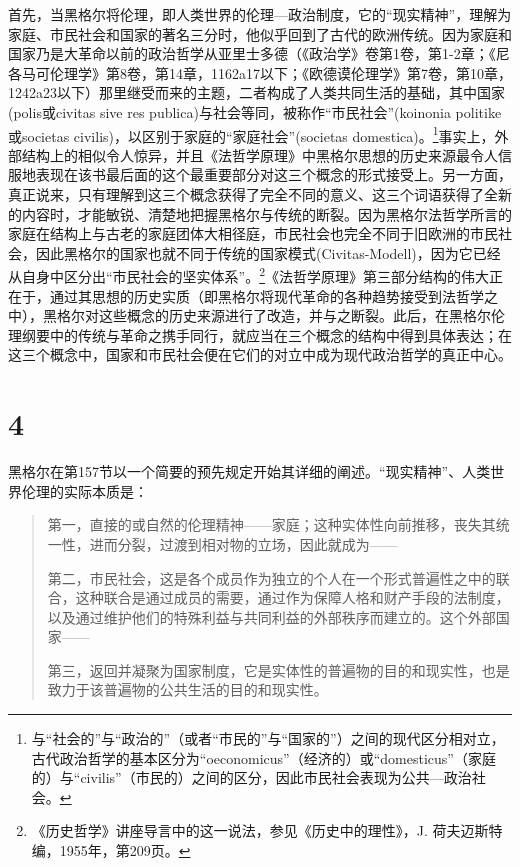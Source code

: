 首先，当黑格尔将伦理，即人类世界的伦理—政治制度，它的“现实精神”，理解为家庭、市民社会和国家的著名三分时，他似乎回到了古代的欧洲传统。因为家庭和国家乃是大革命以前的政治哲学从亚里士多德（《政治学》卷第1卷，第1-2章；《尼各马可伦理学》第8卷，第14章，1162a17以下；《欧德谟伦理学》第7卷，第10章，1242a23以下）那里继受而来的主题，二者构成了人类共同生活的基础，其中国家(polis或civitas sive res publica)与社会等同，被称作“市民社会”(koinonia politike或societas civilis)，以区别于家庭的“家庭社会”(societas domestica)。\footnote{与“社会的”与“政治的”（或者“市民的”与“国家的”）之间的现代区分相对立，古代政治哲学的基本区分为“oeconomicus”（经济的）或“domesticus”（家庭的）与“civilis”（市民的）之间的区分，因此市民社会表现为公共—政治社会。}事实上，外部结构上的相似令人惊异，并且《法哲学原理》中黑格尔思想的历史来源最令人信服地表现在该书最后面的这个最重要部分对这三个概念的形式接受上。另一方面，真正说来，只有理解到这三个概念获得了完全不同的意义、这三个词语获得了全新的内容时，才能敏锐、清楚地把握黑格尔与传统的断裂。因为黑格尔法哲学所言的家庭在结构上与古老的家庭团体大相径庭，市民社会也完全不同于旧欧洲的市民社会，因此黑格尔的国家也就不同于传统的国家模式(Civitas-Modell)，因为它已经从自身中区分出“市民社会的坚实体系”。\footnote{《历史哲学》讲座导言中的这一说法，参见《历史中的理性》，J. 荷夫迈斯特编，1955年，第209页。}《法哲学原理》第三部分结构的伟大正在于，通过其思想的历史实质（即黑格尔将现代革命的各种趋势接受到法哲学之中），黑格尔对这些概念的历史来源进行了改造，并与之断裂。此后，在黑格尔伦理纲要中的传统与革命之携手同行，就应当在三个概念的结构中得到具体表达；在这三个概念中，国家和市民社会便在它们的对立中成为现代政治哲学的真正中心。

\section*{4}

黑格尔在第157节以一个简要的预先规定开始其详细的阐述。“现实精神”、人类世界伦理的实际本质是：

\begin{quote}
第一，直接的或自然的伦理精神——家庭；这种实体性向前推移，丧失其统一性，进而分裂，过渡到相对物的立场，因此就成为——

第二，市民社会，这是各个成员作为独立的个人在一个形式普遍性之中的联合，这种联合是通过成员的需要，通过作为保障人格和财产手段的法制度，以及通过维护他们的特殊利益与共同利益的外部秩序而建立的。这个外部国家——

第三，返回并凝聚为国家制度，它是实体性的普遍物的目的和现实性，也是致力于该普遍物的公共生活的目的和现实性。
\end{quote}

